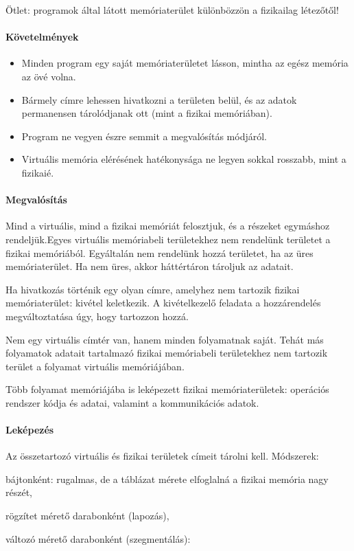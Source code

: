 \documentclass[fleqn,10pt,a4paper]{article}
\theoremstyle{magyar}
\begin{document}
  Ötlet: programok által látott memóriaterület különbözzön a fizikailag létezőtől!

  \paragraph{Követelmények}
  \begin{itemize}
  \item Minden program egy saját memóriaterületet lásson, mintha az egész memória az övé volna.
  \item Bármely címre lehessen hivatkozni a területen belül, és az adatok permanensen tárolódjanak ott (mint a fizikai memóriában).
  \item Program ne vegyen észre semmit a megvalósítás módjáról.
  \item Virtuális memória elérésének hatékonysága ne legyen sokkal rosszabb, mint a fizikaié.
  \end{itemize}

  \paragraph{Megvalósítás}
  
  Mind a virtuális, mind a fizikai memóriát felosztjuk, és a részeket egymáshoz rendeljük.Egyes virtuális memóriabeli
  területekhez nem rendelünk területet a fizikai memóriából. Egyáltalán nem rendelünk hozzá területet, ha az üres
  memóriaterület. Ha nem üres, akkor háttértáron tároljuk az adatait.
  
  Ha hivatkozás történik egy olyan címre, amelyhez nem tartozik fizikai memóriaterület: kivétel keletkezik. A
  kivételkezelő feladata a hozzárendelés megváltoztatása úgy, hogy tartozzon hozzá.
  
  Nem egy virtuális címtér van, hanem minden folyamatnak saját. Tehát más folyamatok adatait tartalmazó fizikai
  memóriabeli területekhez nem tartozik terület a folyamat virtuális memóriájában.
  
  Több folyamat memóriájába is leképezett fizikai memóriaterületek: operációs rendszer kódja és adatai, valamint a
  kommunikációs adatok.


  \paragraph{Leképezés} Az összetartozó virtuális és fizikai területek címeit tárolni kell. Módszerek:
  \begin{inparaenum}[\itshape a)]
  \item bájtonként: rugalmas, de a táblázat mérete elfoglalná a fizikai memória nagy részét,
  \item rögzítet mérető darabonként (lapozás),
  \item változó mérető darabonként (szegmentálás):
  \end{inparaenum}
  
\end{document}
